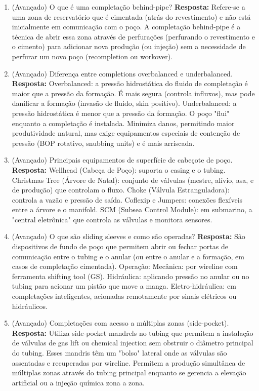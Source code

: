 \documentclass[11pt,a4paper]{article}
\begin{document}
\begin{enumerate}
  \item (Avançado) O que é uma completação behind-pipe?
  \textbf{Resposta:} Refere-se a uma zona de reservatório que é cimentada (atrás do revestimento) e não está inicialmente em comunicação com o poço. A completação behind-pipe é a técnica de abrir essa zona através de perfurações (perfurando o revestimento e o cimento) para adicionar nova produção (ou injeção) sem a necessidade de perfurar um novo poço (recompletion ou workover).

  \item (Avançado) Diferença entre completions overbalanced e underbalanced.
  \textbf{Resposta:} Overbalanced: a pressão hidrostática do fluido de completação é maior que a pressão da formação. É mais segura (controla influxos), mas pode danificar a formação (invasão de fluido, skin positivo). Underbalanced: a pressão hidrostática é menor que a pressão da formação. O poço "flui" enquanto a completação é instalada. Minimiza danos, permitindo maior produtividade natural, mas exige equipamentos especiais de contenção de pressão (BOP rotativo, snubbing units) e é mais arriscada.

  \item (Avançado) Principais equipamentos de superfície de cabeçote de poço.
  \textbf{Resposta:} Wellhead (Cabeça de Poço): suporta o casing e o tubing. Christmas Tree (Árvore de Natal): conjunto de válvulas (mestre, alívio, asa, e de produção) que controlam o fluxo. Choke (Válvula Estranguladora): controla a vazão e pressão de saída. Coflexip e Jumpers: conexões flexíveis entre a árvore e o manifold. SCM (Subsea Control Module): em submarino, a "central eletrônica" que controla as válvulas e monitora sensores.

  \item (Avançado) O que são sliding sleeves e como são operadas?
  \textbf{Resposta:} São dispositivos de fundo de poço que permitem abrir ou fechar portas de comunicação entre o tubing e o anular (ou entre o anular e a formação, em casos de completação cimentada). Operação: Mecânica: por wireline com ferramenta shifting tool (GS). Hidráulica: aplicando pressão no anular ou no tubing para acionar um pistão que move a manga. Eletro-hidráulica: em completações inteligentes, acionadas remotamente por sinais elétricos ou hidráulicos.

  \item (Avançado) Completações com acesso a múltiplas zonas (side-pocket).
  \textbf{Resposta:} Utiliza side-pocket mandrels no tubing que permitem a instalação de válvulas de gas lift ou chemical injection sem obstruir o diâmetro principal do tubing. Esses mandris têm um "bolso" lateral onde as válvulas são assentadas e recuperadas por wireline. Permitem a produção simultânea de múltiplas zonas através do tubing principal enquanto se gerencia a elevação artificial ou a injeção química zona a zona.


\end{enumerate}
\end{document}
